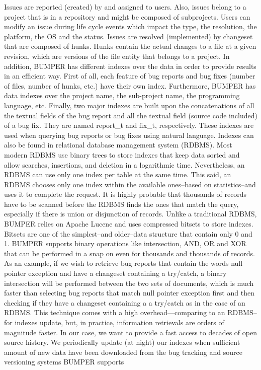 \documentclass[conference]{IEEEtran}
\begin{document}
Issues are reported (created) by and assigned to users.
Also, issues belong to a project that is in a repository and might be composed of subprojects.
Users can modify an issue during life cycle events which impact the type, the resolution, the platform, the OS and the status.
Issues are resolved (implemented) by changeset that are composed of hunks.
Hunks contain the actual changes to a file at a given revision, which are versions of the file entity that belongs to a project.
In addition, BUMPER has different indexes over the data in order to provide results in an efficient way.
First of all, each feature of bug reports and bug fixes (number of files, number of hunks, etc.) have their own index.
Furthermore, BUMPER has data indexes over the project name, the sub-project name, the programming language, etc.
Finally, two major indexes are built upon the concatenations of all the textual fields of the bug report and all the textual field (source code included) of a bug fix.
They are named report\_t and fix\_t, respectively.
These indexes are used when querying bug reports or bug fixes using natural language.
Indexes can also be found in relational database management system (RDBMS).
Most modern RDBMS use binary trees to store indexes that keep data sorted and allow searches, insertions, and deletion in a logarithmic time.
Nevertheless, an RDBMS can use only one index per table at the same time.
This said, an RDBMS chooses only one index within the available ones--based on statistics--and uses it to complete the request.
It is highly probable that thousands of records have to be scanned before the RDBMS finds the ones that match the query, especially if there is union or disjunction of records.
Unlike a traditional RDBMS, BUMPER relies on Apache Lucene and uses compressed bitsets to store indexes.
Bitsets are one of the simplest--and older--data structure that contain only 0 and 1.
BUMPER supports binary operations like intersection, AND, OR and XOR that can be performed in a snap on even for thousands and thousands of records.
As an example, if we wish to retrieve bug reports that contain the words null pointer exception and have a changeset containing a try/catch, a binary intersection will be performed between the two sets of documents, which is much faster than selecting bug reports that match null pointer exception first and then checking if they have a changeset containing a a try/catch as in the case of an RDBMS.
This technique comes with a high overhead—comparing to an RDBMS--for indexes update, but, in practice, information retrievals are orders of magnitude faster.
In our case, we want to provide a fast access to decades of open source history.
We periodically update (at night) our indexes when sufficient amount of new data have been downloaded from the bug tracking and source versioning systems BUMPER supports
\end{document}
